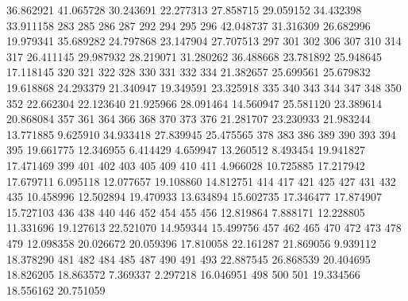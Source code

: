 \documentclass{article}
\begin{document}
\begin{Schunk}
\begin{Soutput}
36.862921 41.065728 30.243691 22.277313 27.858715 29.059152 34.432398 33.911158 
      283       285       286       287       292       294       295       296 
42.048737 31.316309 26.682996 19.979341 35.689282 24.797868 23.147904 27.707513 
      297       301       302       306       307       310       314       317 
26.411145 29.987932 28.219071 31.280262 36.488668 23.781892 25.948645 17.118145 
      320       321       322       328       330       331       332       334 
21.382657 25.699561 25.679832 19.618868 24.293379 21.340947 19.349591 23.325918 
      335       340       343       344       347       348       350       352 
22.662304 22.123640 21.925966 28.091464 14.560947 25.581120 23.389614 20.868084 
      357       361       364       366       368       370       373       376 
21.281707 23.230933 21.983244 13.771885  9.625910 34.933418 27.839945 25.475565 
      378       383       386       389       390       393       394       395 
19.661775 12.346955  6.414429  4.659947 13.260512  8.493454 19.941827 17.471469 
      399       401       402       403       405       409       410       411 
 4.966028 10.725885 17.217942 17.679711  6.095118 12.077657 19.108860 14.812751 
      414       417       421       425       427       431       432       435 
10.458996 12.502894 19.470933 13.634894 15.602735 17.346477 17.874907 15.727103 
      436       438       440       446       452       454       455       456 
12.819864  7.888171 12.228805 11.331696 19.127613 22.521070 14.959344 15.499756 
      457       462       465       470       472       473       478       479 
12.098358 20.026672 20.059396 17.810058 22.161287 21.869056  9.939112 18.378290 
      481       482       484       485       487       490       491       493 
22.887545 26.868539 20.404695 18.826205 18.863572  7.369337  2.297218 16.046951 
      498       500       501 
19.334566 18.556162 20.751059 


\end{Soutput}
\end{Schunk}
\end{document}
